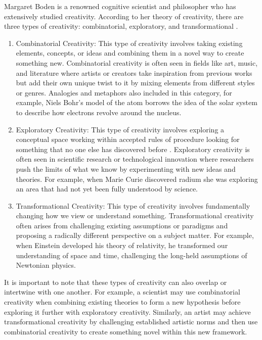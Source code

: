 Margaret Boden is a renowned cognitive scientist and philosopher who has extensively studied creativity. According to her theory of creativity, there are three types of creativity: combinatorial, exploratory, and transformational \citep{Boden1996,Boden2003}.

\begin{enumerate}
\item Combinatorial Creativity: This type of creativity involves taking existing elements, concepts, or ideas and combining them in a novel way to create something new. Combinatorial creativity is often seen in fields like art, music, and literature where artists or creators take inspiration from previous works but add their own unique twist to it by mixing elements from different styles or genres. Analogies and metaphors also included in this category, for example, Niels Bohr's model of the atom borrows the idea of the solar system to describe how electrons revolve around the nucleus.
\item Exploratory Creativity: This type of creativity involves exploring a conceptual space working within accepted rules of procedure looking for something that no one else has discovered before \citep{Miller2019}. Exploratory creativity is often seen in scientific research or technological innovation where researchers push the limits of what we know by experimenting with new ideas and theories. For example, when Marie Curie discovered radium she was exploring an area that had not yet been fully understood by science.
\item Transformational Creativity: This type of creativity involves fundamentally changing how we view or understand something. Transformational creativity often arises from challenging existing assumptions or paradigms and proposing a radically different perspective on a subject matter. For example, when Einstein developed his theory of relativity, he transformed our understanding of space and time, challenging the long-held assumptions of Newtonian physics.
\end{enumerate}

It is important to note that these types of creativity can also overlap or intertwine with one another. For example, a scientist may use combinatorial creativity when combining existing theories to form a new hypothesis before exploring it further with exploratory creativity. Similarly, an artist may achieve transformational creativity by challenging established artistic norms and then use combinatorial creativity to create something novel within this new framework.

